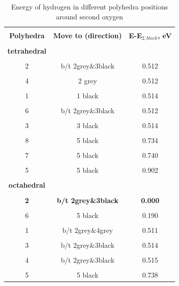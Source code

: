 \begin{table}[h]
\scriptsize{
\caption{Energy of hydrogen in different polyhedra positions around second oxygen}
\label{energy3}
\begin{center}
\begin{tabular}{|c|c|c|}
\hline
& & \\
 \textbf{Polyhedra} & \textbf{Move to (direction)} & \textbf{E-E$_{2,black}$, eV}\\ 
\hline
& & \\
 \textbf{tetrahedral}  &  & \\ 
\hline
& & \\
2 & b/t 2grey\&3black & 0.512 \\
\hline
& & \\
4 & 2 grey & 0.512 \\
\hline
& & \\
1 & 1 black & 0.514 \\
\hline
& & \\
6 & b/t 2grey\&3black & 0.512 \\
\hline
& &\\
3 & 3 black & 0.514 \\
\hline
& & \\
8 & 5 black & 0.734 \\
\hline
& &\\
7 & 5 black & 0.740 \\
\hline
& &\\
5 & 5 black & 0.902 \\
\hline
& &\\
\textbf{octahedral} & & \\
\hline
& & \\
\textbf{2} & \textbf{b/t 2grey\&3black} & \textbf{0.000} \\
\hline
& & \\
6 & 5 black & 0.190 \\
\hline
& & \\
1 & b/t 2grey\&4grey & 0.511 \\
\hline
& & \\
3 & b/t 2grey\&3black & 0.514 \\
\hline
& & \\
4 & b/t 2grey\&3black & 0.515 \\
\hline
& & \\
5 & 5 black & 0.738 \\
\hline
\end{tabular}
\end{center}
}
\end{table}

